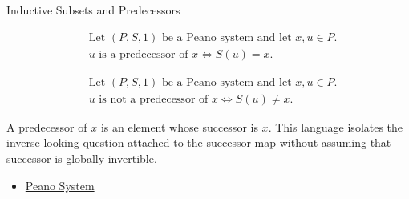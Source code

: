 \begin{topicbox}{Inductive Subsets and Predecessors}
\begin{remark*}
\[
\begin{aligned}
&\text{Let } (P,S,1) \text{ be a Peano system and let } x,u \in P.\\
&u \text{ is a predecessor of } x
\Longleftrightarrow
S(u)=x.
\end{aligned}
\]
\end{remark*}

\begin{remark*}
\[
\begin{aligned}
&\text{Let } (P,S,1) \text{ be a Peano system and let } x,u \in P.\\
&u \text{ is not a predecessor of } x
\Longleftrightarrow
S(u) \neq x.
\end{aligned}
\]
\end{remark*}

\begin{remark*}[Interpretation]
A predecessor of $x$ is an element whose successor is $x$. This language
isolates the inverse-looking question attached to the successor map without
assuming that successor is globally invertible.
\end{remark*}

\begin{remark*}[Dependencies]
\begin{itemize}
  \item \hyperref[def:peano-system]{Peano System}
\end{itemize}
\end{remark*}
\end{topicbox}

